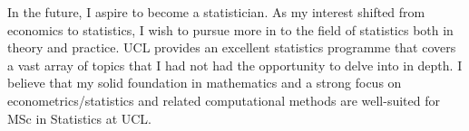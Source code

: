 In the future, I aspire to become a statistician.
As my interest shifted from economics to statistics,
I wish to pursue more in to the field of statistics both in theory and practice.
UCL provides an excellent statistics programme that covers a vast array of topics
that I had not had the opportunity to delve into in depth.
I believe that my solid foundation in mathematics and a strong focus on econometrics/statistics and related computational methods
are well-suited for MSc in Statistics at UCL.
